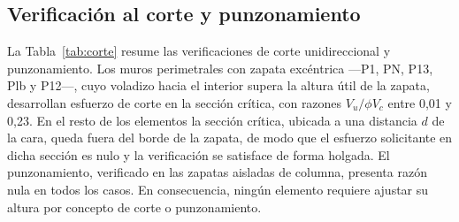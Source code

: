 \subsection{Verificación al corte y punzonamiento}
La Tabla~\ref{tab:corte} resume las verificaciones de corte unidireccional y punzonamiento. Los muros perimetrales con zapata excéntrica —P1, PN, P13, Plb y P12—, cuyo voladizo hacia el interior supera la altura útil de la zapata, desarrollan esfuerzo de corte en la sección crítica, con razones $V_u/\phi V_c$ entre 0,01 y 0,23. En el resto de los elementos la sección crítica, ubicada a una distancia $d$ de la cara, queda fuera del borde de la zapata, de modo que el esfuerzo solicitante en dicha sección es nulo y la verificación se satisface de forma holgada. El punzonamiento, verificado en las zapatas aisladas de columna, presenta razón nula en todos los casos. En consecuencia, ningún elemento requiere ajustar su altura por concepto de corte o punzonamiento.

